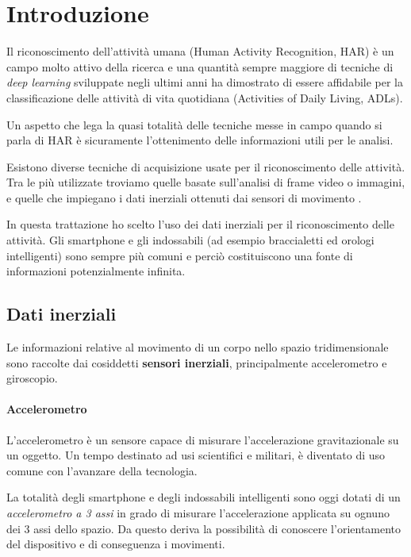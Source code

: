\chapter{Introduzione}

Il riconoscimento dell'attività umana (Human Activity Recognition, HAR) è un campo molto attivo della ricerca e una
quantità sempre maggiore di tecniche di \textit{deep learning} sviluppate negli ultimi anni ha dimostrato di essere 
affidabile per la classificazione delle attività di vita quotidiana (Activities of Daily Living, ADLs).

Un aspetto che lega la quasi totalità delle tecniche messe in campo quando si parla di HAR è sicuramente l'ottenimento delle informazioni 
utili per le analisi. 

Esistono diverse tecniche di acquisizione usate per il riconoscimento delle attività. 
Tra le più utilizzate troviamo quelle basate sull'analisi di frame video o immagini, e quelle 
che impiegano i dati inerziali ottenuti dai sensori di movimento \cite{har_survey}.

\vspace{5mm} %

In questa trattazione ho scelto l'uso dei dati inerziali per il riconoscimento delle attività.
Gli smartphone e gli indossabili (ad esempio braccialetti ed orologi intelligenti) sono sempre più comuni e perciò costituiscono 
una fonte di informazioni potenzialmente infinita.


\section{Dati inerziali}
Le informazioni relative al movimento di un corpo nello spazio tridimensionale sono raccolte 
dai cosiddetti \textbf{sensori inerziali}, principalmente accelerometro e giroscopio.
\subsubsection{Accelerometro}
L'accelerometro è un sensore capace di misurare l'accelerazione gravitazionale su un oggetto.
Un tempo destinato ad usi scientifici e militari, è diventato di uso comune con l'avanzare della tecnologia.

La totalità degli smartphone e degli indossabili intelligenti sono oggi dotati di un \textit{accelerometro a 3 assi} in grado 
di misurare l'accelerazione applicata su ognuno dei 3 assi dello spazio. 
Da questo deriva la possibilità di conoscere l'orientamento del dispositivo e di conseguenza i movimenti.

